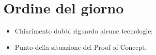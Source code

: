 \section{Ordine del giorno}

\begin{itemize}
\item Chiarimento dubbi riguardo alcune tecnologie;
\item Punto della situazione del Proof of Concept.
\end{itemize}